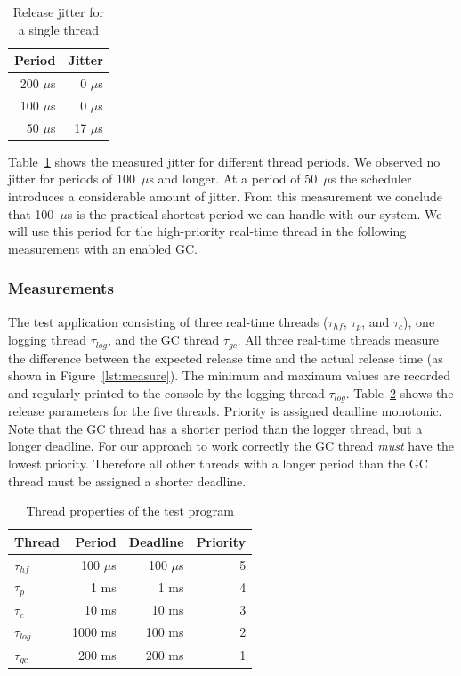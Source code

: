 \begin{table}
    \centering
    \begin{tabular}{rr}
    \toprule
    Period & Jitter \\
    \midrule
    200 $\mu$s & 0 $\mu$s \\
    100 $\mu$s & 0 $\mu$s \\
    50 $\mu$s & 17 $\mu$s \\
    \bottomrule
    \end{tabular}
    \caption{Release jitter for a single thread}
    \label{tab:single}
\end{table}

Table~\ref{tab:single} shows the measured jitter for different
thread periods. We observed no jitter for periods of 100~$\mu$s and
longer. At a period of 50~$\mu$s the scheduler introduces a
considerable amount of jitter. From this measurement we conclude
that 100~$\mu$s is the practical shortest period we can handle with
our system. We will use this period for the high-priority real-time
thread in the following measurement with an enabled GC.

\subsubsection{Measurements}

The test application consisting of three real-time threads
($\tau_{hf}$, $\tau_{p}$, and $\tau_{c}$), one logging thread
$\tau_{log}$, and the GC thread $\tau_{gc}$. All three real-time
threads measure the difference between the expected release time and
the actual release time (as shown in Figure~\ref{lst:measure}). The
minimum and maximum values are recorded and regularly printed to the
console by the logging thread $\tau_{log}$. Table~\ref{tab:exp}
shows the release parameters for the five threads. Priority is
assigned deadline monotonic. Note that the GC thread has a shorter
period than the logger thread, but a longer deadline. For our
approach to work correctly the GC thread \emph{must} have the lowest
priority. Therefore all other threads with a longer period than the
GC thread must be assigned a shorter deadline.

\begin{table}
    \centering
    \begin{tabular}{lrrr}
    \toprule
    Thread & Period & Deadline & Priority \\
    \midrule
    $\tau_{hf}$ & 100 $\mu$s & 100 $\mu$s & 5 \\
    $\tau_{p}$ &  1 ms & 1 ms & 4 \\
    $\tau_{c}$ & 10 ms & 10 ms & 3 \\
    $\tau_{log}$ & 1000 ms & 100 ms & 2 \\
    $\tau_{gc}$ & 200 ms & 200 ms & 1 \\
    \bottomrule
    \end{tabular}
    \caption{Thread properties of the test program}
    \label{tab:exp}
\end{table}

